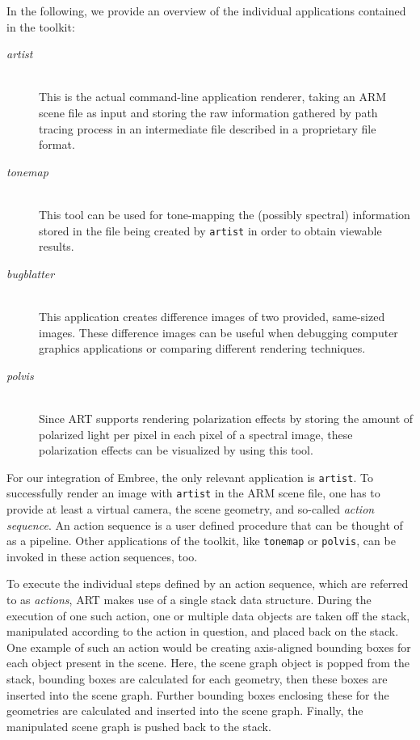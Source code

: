 In the following, we provide an overview of the individual applications contained in the toolkit:
\begin{description}
	\item[\emph{artist}] \hfil \\ This is the actual command-line application renderer, taking an ARM scene file as input and storing the raw information gathered by path tracing process in an intermediate file described in a proprietary file format.
	\item[\emph{tonemap}] \hfil \\ This tool can be used for tone-mapping the (possibly spectral) information stored in the file being created by \texttt{artist} in order to obtain viewable results.
	\item[\emph{bugblatter}] \hfil \\ This application creates difference images of two provided, same-sized images. These difference images can be useful when debugging computer graphics applications or comparing different rendering techniques.
	\item[\emph{polvis}] \hfil \\ Since ART supports rendering polarization effects by storing the amount of polarized light per pixel in each pixel of a spectral image, these polarization effects can be visualized by using this tool.
\end{description}

For our integration of Embree, the only relevant application is \texttt{artist}.
To successfully render an image with \texttt{artist} in the ARM scene file, one has to provide at least a virtual camera, the scene geometry, and so-called \emph{action sequence}. An action sequence is a user defined procedure that can be thought of as a pipeline. Other applications of the toolkit, like \texttt{tonemap} or \texttt{polvis}, can be invoked in these action sequences, too.

To execute the individual steps defined by an action sequence, which are referred to as \emph{actions}, ART makes use of a single stack data structure. During the execution of one such action, one or multiple data objects are taken off the stack, manipulated according to the action in question, and placed back on the stack. One example of such an action would be creating axis-aligned bounding boxes for each object present in the scene. Here, the scene graph object is popped from the stack, bounding boxes are calculated for each geometry, then these boxes are inserted into the scene graph. Further bounding boxes enclosing these for the geometries are calculated and inserted into the scene graph. Finally, the manipulated scene graph is pushed back to the stack.

